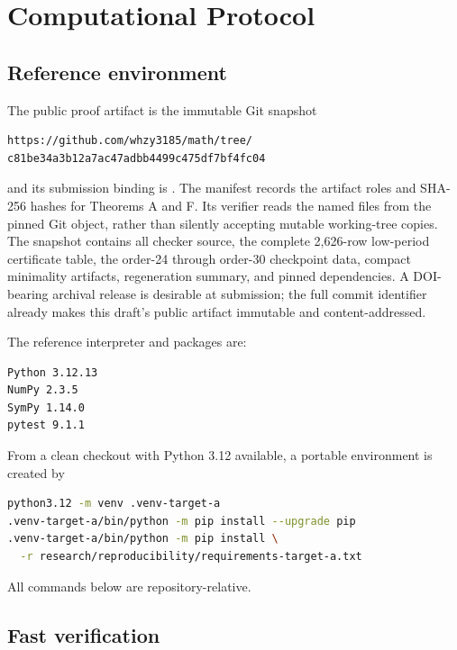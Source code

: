 \section{Computational Protocol}

\subsection{Reference environment}

The public proof artifact is the immutable Git snapshot

\begin{lstlisting}[language={}]
https://github.com/whzy3185/math/tree/
c81be34a3b12a7ac47adbb4499c475df7bf4fc04
\end{lstlisting}

and its submission binding is
. The
manifest records the artifact roles and SHA-256 hashes for Theorems A and F.
Its verifier reads the named files from the pinned Git object, rather than
silently accepting mutable working-tree copies. The snapshot contains all
checker source, the complete 2,626-row low-period certificate table, the
order-24 through order-30 checkpoint data, compact minimality artifacts,
regeneration summary, and pinned dependencies. A DOI-bearing archival release
is desirable at submission; the full commit identifier already makes this
draft's public artifact immutable and content-addressed.

The reference interpreter and packages are:

\begin{lstlisting}[language={}]
Python 3.12.13
NumPy 2.3.5
SymPy 1.14.0
pytest 9.1.1
\end{lstlisting}

From a clean checkout with Python 3.12 available, a portable environment is
created by

\begin{lstlisting}[language={bash}]
python3.12 -m venv .venv-target-a
.venv-target-a/bin/python -m pip install --upgrade pip
.venv-target-a/bin/python -m pip install \
  -r research/reproducibility/requirements-target-a.txt
\end{lstlisting}

All commands below are repository-relative.

\subsection{Fast verification}


